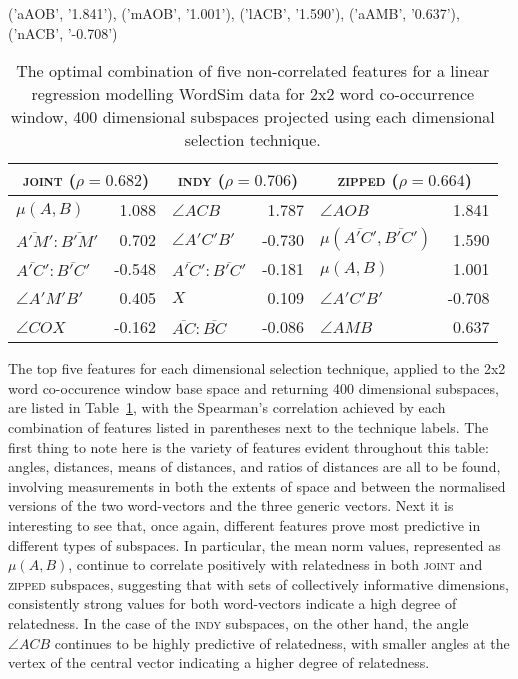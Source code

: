 ('aAOB', '1.841'), ('mAOB', '1.001'), ('lACB', '1.590'), ('aAMB', '0.637'), ('nACB', '-0.708')

\begin{table}
\centering
\begin{tabular}{lr|lr|lr}
\hline
\multicolumn{2}{c}{\textsc{joint} ($\rho = 0.682$)} & \multicolumn{2}{c}{\textsc{indy} ($\rho = 0.706$)} & \multicolumn{2}{c}{\textsc{zipped} ($\rho = 0.664$)} \\
\hline
$\mu(A,B)$ & 1.088 & $\angle ACB$ & 1.787 & $\angle AOB$ & 1.841 \\
$\overline{A'M'}:\overline{B'M'}$ & 0.702 & $\angle A'C'B'$ & -0.730 & $\mu(\overline{A'C'},\overline{B'C'})$ & 1.590 \\
$\overline{A'C'}:\overline{B'C'}$ & -0.548 & $\overline{A'C'}:\overline{B'C'}$ & -0.181 & $\mu(A,B)$ & 1.001 \\
$\angle A'M'B'$ & 0.405 & $X$ & 0.109 & $\angle A'C'B'$ & -0.708 \\
$\angle{COX}$ & -0.162 & $\overline{AC}:\overline{BC}$ & -0.086 & $\angle AMB$ & 0.637 \\
\hline
\end{tabular}
\caption{The optimal combination of five non-correlated features for a linear regression modelling WordSim data for 2x2 word co-occurrence window, 400 dimensional subspaces projected using each dimensional selection technique.}
\label{tab:fivelated}
\end{table}

The top five features for each dimensional selection technique, applied to the 2x2 word co-occurence window base space and returning 400 dimensional subspaces, are listed in Table~\ref{tab:fivelated}, with the Spearman's correlation achieved by each combination of features listed in parentheses next to the technique labels.  The first thing to note here is the variety of features evident throughout this table: angles, distances, means of distances, and ratios of distances are all to be found, involving measurements in both the extents of space and between the normalised versions of the two word-vectors and the three generic vectors.  Next it is interesting to see that, once again, different features prove most predictive in different types of subspaces.  In particular, the mean norm values, represented as $\mu(A,B)$, continue to correlate positively with relatedness in both \textsc{joint} and \textsc{zipped} subspaces, suggesting that with sets of collectively informative dimensions, consistently strong values for both word-vectors indicate a high degree of relatedness.  In the case of the \textsc{indy} subspaces, on the other hand, the angle $\angle ACB$ continues to be highly predictive of relatedness, with smaller angles at the vertex of the central vector indicating a higher degree of relatedness.

